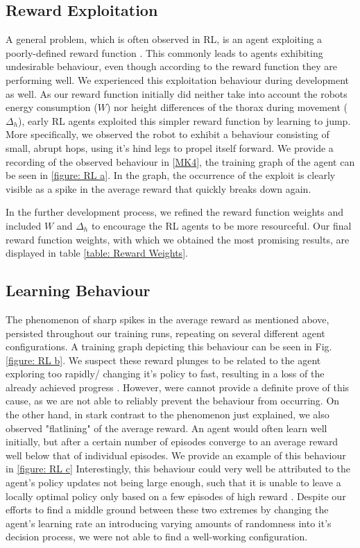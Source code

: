 \subsection{Reward Exploitation}
A general problem, which is often observed in RL, is an agent exploiting a poorly-defined reward function \parencite{silver2015}.
This commonly leads to agents exhibiting undesirable behaviour, even though according to the reward function they are performing well.
We experienced this exploitation behaviour during development as well.
As our reward function initially did neither take into account the robots energy consumption ($W$) nor height differences of the thorax during movement ($ \Delta_h$), early RL agents exploited this simpler reward function by learning to jump.
More specifically, we observed the robot to exhibit a behaviour consisting of small, abrupt hops, using it's hind legs to propel itself forward.
We provide a recording of the observed behaviour in [\hyperref[vid: MK4]{MK4}], the training graph of the agent can be seen in \ref{figure: RL a}.
In the graph, the occurrence of the exploit is clearly visible as a spike in the average reward that quickly breaks down again.

In the further development process, we refined the reward function weights and included $W$ and $\Delta_h$ to encourage the RL agents to be more resourceful. 
Our final reward function weights, with which we obtained the most promising results, are displayed in table \ref{table: Reward Weights}.


\subsection{Learning Behaviour}
The phenomenon of sharp spikes in the average reward as mentioned above, persisted throughout our training runs, repeating on several different agent configurations.
A training graph depicting this behaviour can be seen in Fig. \ref{figure: RL b}.
We suspect these reward plunges to be related to the agent exploring too rapidly/ changing it's policy to fast, resulting in a loss of the already achieved progress \parencite{silver2015}.
However, were cannot provide a definite prove of this cause, as we are not able to reliably prevent the behaviour from occurring.
On the other hand, in stark contrast to the phenomenon just explained, we also observed "flatlining" of the average reward.
An agent would often learn well initially, but after a certain number of episodes converge to an average reward well below that of individual episodes.
We provide an example of this behaviour in \ref{figure: RL c}
Interestingly, this behaviour could very well be attributed to the agent's policy updates not being large enough, such that it is unable to leave a locally optimal policy only based on a few episodes of high reward \parencite{silver2015}.
Despite our efforts to find a middle ground between these two extremes by changing the agent's learning rate an introducing varying amounts of randomness into it's decision process, we were not able to find a well-working configuration.


